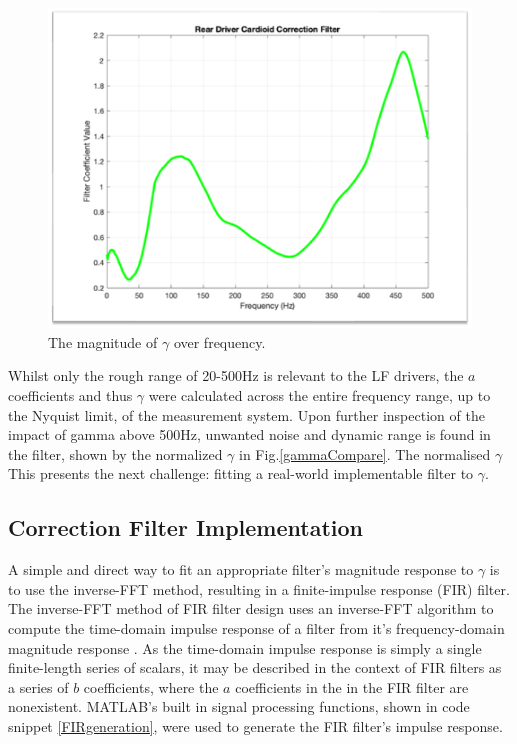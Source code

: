 \documentclass{report}
\begin{document}
            \begin{figure}[H]
                \centering
                \includegraphics[scale=0.35]{figs/gammaMagnitude.png}%
                \caption{The magnitude of $\gamma$ over frequency.}
                \label{gammaMagnitude}
            \end{figure}
            Whilst only the rough range of 20-500Hz is relevant to the LF drivers, the $a$ coefficients and thus $\gamma$ were calculated across the entire frequency range, up to the Nyquist limit, of the measurement system.
            Upon further inspection of the impact of gamma above 500Hz, unwanted noise and dynamic range is found in the filter, shown by the normalized $\gamma$ in Fig.\ref{gammaCompare}.
            The normalised $\gamma$ 
            This presents the next challenge: fitting a real-world implementable filter to $\gamma$.

        \subsection{Correction Filter Implementation}
            A simple and direct way to fit an appropriate filter's magnitude response to $\gamma$ is to use the inverse-FFT method, resulting in a finite-impulse response (FIR) filter.
            The inverse-FFT method of FIR filter design uses an inverse-FFT algorithm to compute the time-domain impulse response of a filter from it's frequency-domain magnitude response \cite{li2019digital}.
            As the time-domain impulse response is simply a single finite-length series of scalars, it may be described in the context of FIR filters as a series of $b$ coefficients, where the $a$ coefficients in the in the FIR filter are nonexistent.
            MATLAB's built in signal processing functions, shown in code snippet \ref{FIRgeneration}, were used to generate the FIR filter's impulse response.
\end{document}
